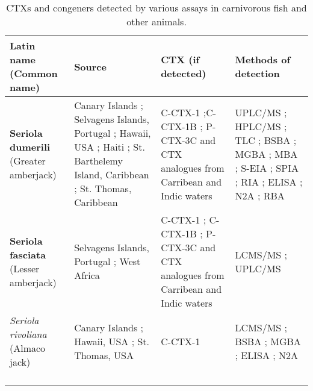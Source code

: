 \begin{landscape}
\begin{longtable}{ |  p{4.5cm} | p{5cm} | p{4.5cm} | p{5cm} | }
\caption{CTXs and congeners detected by various assays in carnivorous fish and other animals.}\\
\hline
\textbf{Latin name (Common name)} & \textbf{Source} & \textbf{CTX (if detected)} & \textbf{Methods of detection} \\
\hline
 \textbf{Seriola dumerili} (Greater amberjack) & Canary Islands \cite{caillaud2012towards}; Selvagens Islands, Portugal \cite{otero2010first}; Hawaii, USA \cite{campora2008detection,hokama1977radioimmunoassay,hokama1983rapid,hokama1985rapid}; Haiti \cite{poli1997identification}; St. Barthelemy Island, Caribbean \cite{vernoux1986heterogeneity}; St. Thomas, Caribbean \cite{granade1976ciguatera} & C-CTX-1 \cite{poli1997identification};C-CTX-1B \cite{otero2010first}; P-CTX-3C and CTX analogues from Carribean and Indic waters \cite{otero2010first} & UPLC/MS \cite{otero2010first}; HPLC/MS \cite{poli1997identification}; TLC \cite{vernoux1986heterogeneity}; BSBA \cite{granade1976ciguatera}; MGBA \cite{campora2008detection,granade1976ciguatera}; MBA \cite{hokama1983rapid,hokama1985rapid,vernoux1986heterogeneity}; S-EIA \cite{hokama1985rapid}; SPIA \cite{otero2010first}; RIA \cite{campora2008detection,hokama1983rapid}; ELISA \cite{campora2008detection}; N2A \cite{caillaud2012towards,campora2008detection}; RBA \cite{} \\
\hline
 \textbf{Seriola fasciata} (Lesser amberjack) & Selvagens Islands, Portugal \cite{otero2010first}; West Africa \cite{boada2010ciguatera} & C-CTX-1 \cite{boada2010ciguatera}; C-CTX-1B \cite{otero2010first}; P-CTX-3C and CTX analogues from Carribean and Indic waters \cite{otero2010first} & LCMS/MS \cite{boada2010ciguatera}; UPLC/MS \cite{otero2010first}\\
\hline
 \emph{Seriola rivoliana} (Almaco jack) & Canary Islands \cite{campora2010evaluating}; Hawaii, USA \cite{campora2008detection}; St. Thomas, USA \cite{granade1976ciguatera} & C-CTX-1 \cite{} & LCMS/MS \cite{}; BSBA \cite{granade1976ciguatera}; MGBA \cite{granade1976ciguatera}; ELISA \cite{campora2008detection,campora2010evaluating}; N2A \cite{campora2008detection,campora2010evaluating} \\
\hline
  &  &  & \\
\hline
  &  &  & \\
\hline
  &  &  & \\
\hline
  &  &  & \\

\end{longtable}
\end{landscape}
